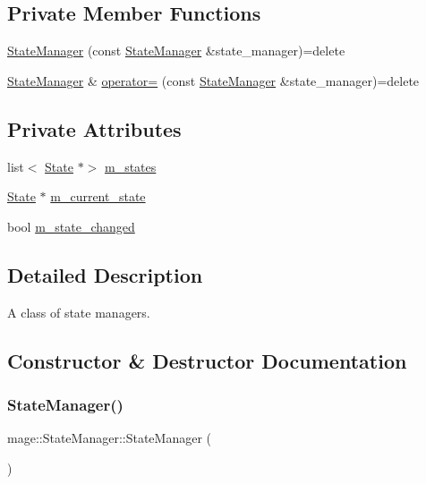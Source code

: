 \subsection*{Private Member Functions}
\begin{DoxyCompactItemize}
\item 
\hyperlink{classmage_1_1_state_manager_a1921a9b055fab1c7efae18e15b54191b}{State\+Manager} (const \hyperlink{classmage_1_1_state_manager}{State\+Manager} \&state\+\_\+manager)=delete
\item 
\hyperlink{classmage_1_1_state_manager}{State\+Manager} \& \hyperlink{classmage_1_1_state_manager_a5aaf364d1f40e7d333693d1de42efec3}{operator=} (const \hyperlink{classmage_1_1_state_manager}{State\+Manager} \&state\+\_\+manager)=delete
\end{DoxyCompactItemize}
\subsection*{Private Attributes}
\begin{DoxyCompactItemize}
\item 
list$<$ \hyperlink{classmage_1_1_state}{State} $\ast$$>$ \hyperlink{classmage_1_1_state_manager_a2181432805f365bfb8ccff0f959d2121}{m\+\_\+states}
\item 
\hyperlink{classmage_1_1_state}{State} $\ast$ \hyperlink{classmage_1_1_state_manager_a737122d580b709e0d122db4a6e1d9006}{m\+\_\+current\+\_\+state}
\item 
bool \hyperlink{classmage_1_1_state_manager_a8e905ec2358a18a5b56d44cf79799afa}{m\+\_\+state\+\_\+changed}
\end{DoxyCompactItemize}


\subsection{Detailed Description}
A class of state managers. 

\subsection{Constructor \& Destructor Documentation}
\hypertarget{classmage_1_1_state_manager_a6c4504d0b50fe671299b080f3be30c8e}{}\label{classmage_1_1_state_manager_a6c4504d0b50fe671299b080f3be30c8e} 
\subsubsection{\texorpdfstring{State\+Manager()}{StateManager()}\hspace{0.1cm}{\footnotesize\ttfamily [1/2]}}
{\footnotesize\ttfamily mage\+::\+State\+Manager\+::\+State\+Manager (\begin{DoxyParamCaption}{ }\end{DoxyParamCaption})}

